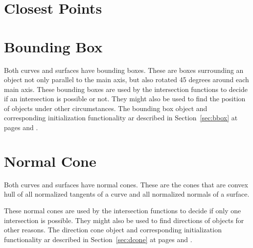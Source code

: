 \section{Closest Points}

\pgsbreak

\pgsbreak

\pgsbreak

\pgsbreak
\section{Bounding Box}
Both curves and surfaces have bounding boxes. These are boxes surrounding an object not only parallel to the main axis, but also rotated 45 degrees around each main axis. These bounding boxes are used by the intersection functions to decide if an intersection is possible or not. They might also be used to find the position of objects under other circumstances. The bounding box object and corresponding initialization functionality ar described in Section~\ref{sec:bbox} at pages \pageref{SISLBox} and \pageref{newbox}.

\pgsbreak
\section{Normal Cone}
Both curves and surfaces have normal cones. These are the cones that are convex hull of all normalized tangents of a curve and all normalized normals of a surface.

These normal cones are used by the intersection functions to decide if only one intersection is possible. They might also be used to find directions of objects for other reasons. The direction cone object and corresponding initialization functionality ar described in Section~\ref{sec:dcone} at pages \pageref{SISLDir} and \pageref{newdir}.

